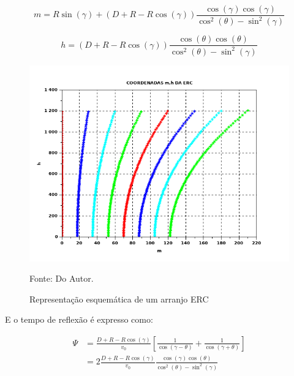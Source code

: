 \begin{equation}
\label{eq:7.1}
 m=R\sin(\gamma)+(D+R-R\cos(\gamma))\frac{\cos(\gamma)\cos(\gamma)}{\cos^2(\theta)-\sin^2(\gamma)}
\end{equation}

\begin{equation}
\label{eq:7.2}
 h=(D+R-R\cos(\gamma))\frac{\cos(\theta)\cos(\theta)}{\cos^2(\theta)-\sin^2(\gamma)}
\end{equation}

\begin{figure}[htb]
\caption{Representação esquemática de um arranjo ERC }
\begin{center}
\includegraphics[scale=0.5]{images/coordenadas_CRE.png}
\vspace{-0.3cm}
\end{center}
\begin{center}
 Fonte: Do Autor.
\end{center}
\label{fig:7.2}
\end{figure}


E o tempo de reflexão é expresso como:

\begin{equation}
\begin{flalign*}
\label{eq:7.3}
 \Psi &=\frac{D+R-R\cos(\gamma)}{v_0} \left[ \frac{1}{\cos(\gamma-\theta)}+\frac{1}{\cos(\gamma+\theta)} \right] \\
 &=2\frac{D+R-R\cos(\gamma)}{v_0}\frac{\cos(\gamma)\cos(\theta)}{\cos^2(\theta)-\sin^2(\gamma)}
\end{flalign*} 
\end{equation}


